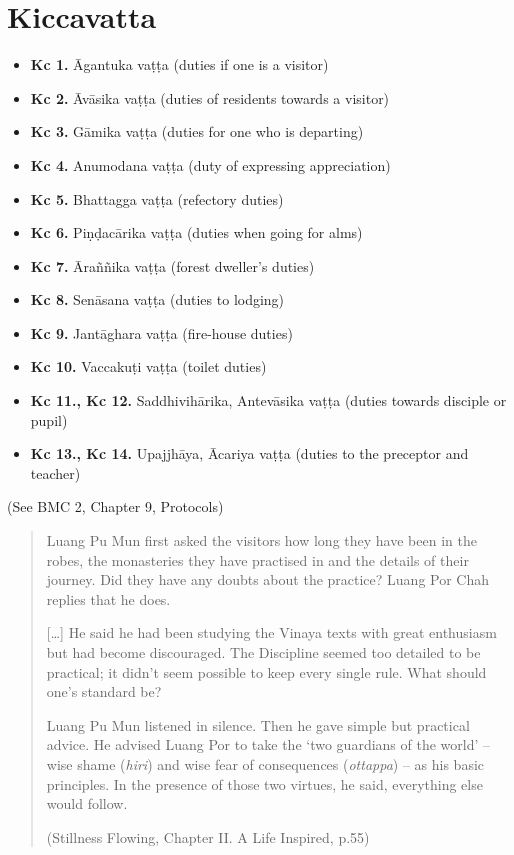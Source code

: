 \chapter{Kiccavatta}

\begin{itemize}
\tightlist
\item
  \textbf{Kc 1.} Āgantuka vaṭṭa (duties if one is a visitor)
\item
  \textbf{Kc 2.} Āvāsika vaṭṭa (duties of residents towards a visitor)
\item
  \textbf{Kc 3.} Gāmika vaṭṭa (duties for one who is departing)
\item
  \textbf{Kc 4.} Anumodana vaṭṭa (duty of expressing appreciation)
\item
  \textbf{Kc 5.} Bhattagga vaṭṭa (refectory duties)
\item
  \textbf{Kc 6.} Piṇḍacārika vaṭṭa (duties when going for alms)
\item
  \textbf{Kc 7.} Āraññika vaṭṭa (forest dweller's duties)
\item
  \textbf{Kc 8.} Senāsana vaṭṭa (duties to lodging)
\item
  \textbf{Kc 9.} Jantāghara vaṭṭa (fire-house duties)
\item
  \textbf{Kc 10.} Vaccakuṭi vaṭṭa (toilet duties)
\item
  \textbf{Kc 11., Kc 12.} Saddhivihārika, Antevāsika vaṭṭa (duties
  towards disciple or pupil)
\item
  \textbf{Kc 13., Kc 14.} Upajjhāya, Ācariya vaṭṭa (duties to the
  preceptor and teacher)
\end{itemize}

(See BMC 2, Chapter 9, Protocols)

\begin{quote}
Luang Pu Mun first asked the visitors how long they have been in the
robes, the monasteries they have practised in and the details of their
journey. Did they have any doubts about the practice? Luang Por Chah
replies that he does.

{[}\ldots{]} He said he had been studying the Vinaya texts with great
enthusiasm but had become discouraged. The Discipline seemed too
detailed to be practical; it didn't seem possible to keep every single
rule. What should one's standard be?

Luang Pu Mun listened in silence. Then he gave simple but practical
advice. He advised Luang Por to take the `two guardians of the world' --
wise shame (\emph{hiri}) and wise fear of consequences (\emph{ottappa})
-- as his basic principles. In the presence of those two virtues, he
said, everything else would follow.

(Stillness Flowing, Chapter II. A Life Inspired, p.55)
\end{quote}

